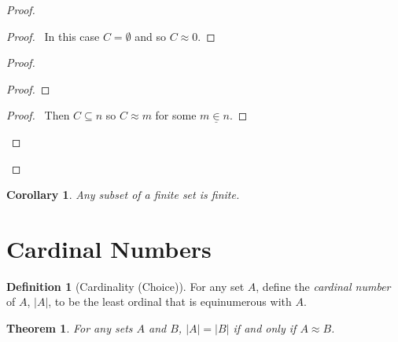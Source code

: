 \documentclass{article}
\let\qed\relax
\newtheorem{theorem}[axiom]{Theorem}
\newtheorem{corollary}{Corollary}[axiom]
\theoremstyle{definition}
\newtheorem{definition}[axiom]{Definition}
\begin{document}
    \begin{proof}
        \pf
        \begin{proof}
            \pf\ In this case $C = \emptyset$ and so $C \approx 0$.
        \end{proof}
        \begin{proof}
            \begin{proof}
            \end{proof}
            \begin{proof}
                \pf\ Then $C \subseteq n$ so $C \approx m$ for some $m \underline{\in} n$.
            \end{proof}
        \end{proof}
        \qed
    \end{proof}

    \begin{corollary}
        Any subset of a finite set is finite.
    \end{corollary}

    \section{Cardinal Numbers}

    \begin{definition}[Cardinality (Choice)]
        For any set $A$, define the \emph{cardinal number} of $A$, $|A|$, to be the least ordinal that is
        equinumerous with $A$.
    \end{definition}

    \begin{theorem}
        For any sets $A$ and $B$, $|A| = |B|$ if and only if $A \approx B$.
    \end{theorem}
\end{document}
